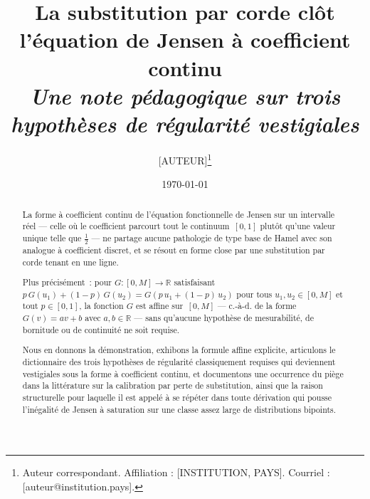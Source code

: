 \documentclass[11pt,a4paper]{amsart}
\newcommand{\R}{\mathbb R}
\begin{document}
\title[La substitution par corde clôt l'équation de Jensen à coefficient continu]%
{La substitution par corde clôt l'équation de Jensen à coefficient continu\\
\normalsize\textit{Une note pédagogique sur trois hypothèses de régularité vestigiales}}

\author{[AUTEUR]\thanks{Auteur correspondant. Affiliation :
[INSTITUTION, PAYS]. Courriel : [auteur@institution.pays].}}

\date{\today}


\begin{abstract}
La forme à coefficient continu de l'équation fonctionnelle de Jensen sur
un intervalle réel --- celle où le coefficient parcourt tout le
continuum~$[0,1]$ plutôt qu'une valeur unique telle que $\tfrac12$ ---
ne partage aucune pathologie de type base de Hamel avec son analogue à
coefficient discret, et se résout en forme close par une substitution par
corde tenant en une ligne.

Plus précisément~: pour $G\colon[0,M]\to\R$ satisfaisant
$p\,G(u_1) + (1-p)\,G(u_2) = G(p\,u_1 + (1-p)\,u_2)$ pour tous
$u_1,u_2\in[0,M]$ et tout $p\in[0,1]$, la fonction $G$ est affine
sur~$[0,M]$ --- c.-à-d. de la forme $G(v) = av + b$ avec $a,b\in\R$
--- sans qu'aucune hypothèse de mesurabilité, de bornitude ou de
continuité ne soit requise.

Nous en donnons la démonstration, exhibons la formule affine explicite,
articulons le dictionnaire des trois hypothèses de régularité
classiquement requises qui deviennent vestigiales sous la forme à
coefficient continu, et documentons une occurrence du piège dans la
littérature sur la calibration par perte de substitution, ainsi que la
raison structurelle pour laquelle il est appelé à se répéter dans toute
dérivation qui pousse l'inégalité de Jensen à saturation sur une classe
assez large de distributions bipoints.
\end{abstract}
\end{document}
